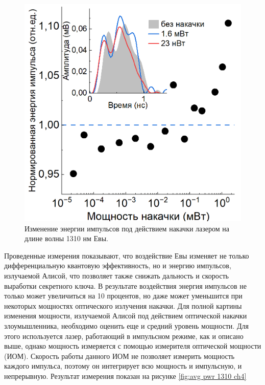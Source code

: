 \begin{figure}
    \centering
    \includegraphics[width=\linewidth]{images/1310_энергия.png}
    \caption{Изменение энергии импульсов под действием накачки лазером на длине волны 1310 нм Евы.}
    \label{fig:energy 1310 ch4}
\end{figure}
Проведенные измерения показывают, что воздействие Евы изменяет не только дифференциальную квантовую эффективность, но и энергию импульсов, излучаемой Алисой, что позволяет также снижать дальность и скорость выработки секретного ключа. В результате воздействия энергия импульсов не только может увеличиться на 10 процентов, но даже может уменьшится при некоторых мощностях оптического излучения накачки.
\newline Для полной картины изменения мощности, излучаемой Алисой под действием оптической накачки злоумышленника, необходимо оценить еще и средний уровень мощности. Для этого используется лазер, работающий в импульсном режиме, как и описано выше, однако мощность измеряется с помощью измерителя оптической мощности (ИОМ). Скорость работы данного ИОМ не позволяет измерить мощность каждого импульса, поэтому он интегрирует всю мощность и импульсную, и непрерывную. Результат измерения показан на рисунке \ref{fig:avg pwr 1310 ch4} 
